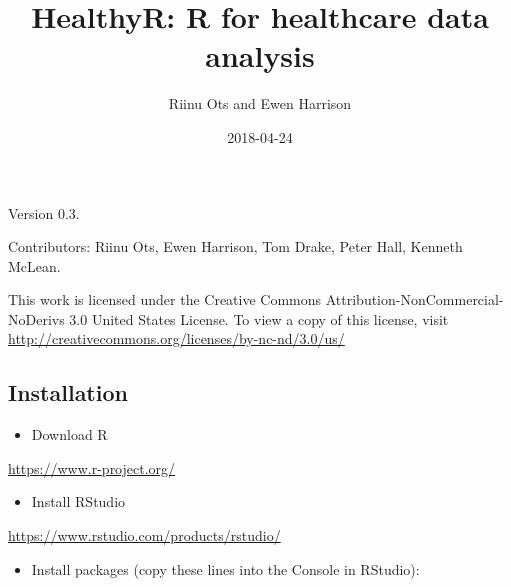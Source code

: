 \documentclass[]{book}
\title{HealthyR: R for healthcare data analysis}
\author{Riinu Ots and Ewen Harrison}
\date{2018-04-24}
\makeatletter
\providecommand{\tightlist}{%
  \setlength{\itemsep}{0pt}\setlength{\parskip}{0pt}}
\newenvironment{kframe}{%
\medskip{}
\setlength{\fboxsep}{.8em}
 \def\at@end@of@kframe{}%
 \ifinner\ifhmode%
  \def\at@end@of@kframe{\end{minipage}}%
  \begin{minipage}{\columnwidth}%
 \fi\fi%
 \def\FrameCommand##1{\hskip\@totalleftmargin \hskip-\fboxsep
 \colorbox{shadecolor}{##1}\hskip-\fboxsep
     \hskip-\linewidth \hskip-\@totalleftmargin \hskip\columnwidth}%
 \MakeFramed {\advance\hsize-\width
   \@totalleftmargin\z@ \linewidth\hsize
   \@setminipage}}%
 {\par\unskip\endMakeFramed%
 \at@end@of@kframe}
\newenvironment{rmdblock}[1]
  {
  \begin{itemize}
  \renewcommand{\labelitemi}{
    \raisebox{-.7\height}[0pt][0pt]{
      {\setkeys{Gin}{width=3em,keepaspectratio}\texttt{[image: images/\#1]}}
    }
  }
  \setlength{\fboxsep}{1em}
  \begin{kframe}
  \item
  }
  {
  \end{kframe}
  \end{itemize}
  }
\newenvironment{healthyr}
  {\begin{rmdblock}{cover}}
  {\end{rmdblock}}
\makeatother
\begin{document}
\maketitle

{
\hypersetup{linkcolor=black}
\setcounter{tocdepth}{1}
\tableofcontents
}
\chapter*{}\label{section}

Version 0.3.

Contributors: Riinu Ots, Ewen Harrison, Tom Drake, Peter Hall, Kenneth
McLean.

This work is licensed under the Creative Commons
Attribution-NonCommercial-NoDerivs 3.0 United States License. To view a
copy of this license, visit
\url{http://creativecommons.org/licenses/by-nc-nd/3.0/us/}

\section{Installation}\label{installation}

\begin{healthyr}
\begin{itemize}
\tightlist
\item
  Download R
\end{itemize}
\end{healthyr}

\url{https://www.r-project.org/}

\begin{healthyr}
\begin{itemize}
\tightlist
\item
  Install RStudio
\end{itemize}
\end{healthyr}

\url{https://www.rstudio.com/products/rstudio/}

\begin{healthyr}
\begin{itemize}
\tightlist
\item
  Install packages (copy these lines into the Console in RStudio):
\end{itemize}
\end{healthyr}
\end{document}
